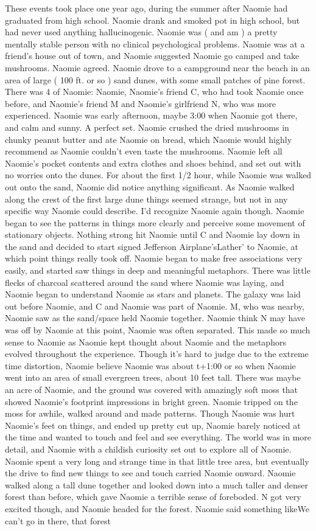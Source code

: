 \documentclass[12pt]{book}
\begin{document}
These events took place one year ago, during the summer after Naomie had graduated from high school. Naomie drank and smoked pot in high school, but had never used anything hallucinogenic. Naomie was ( and am ) a pretty mentally stable person with no clinical psychological problems. Naomie was at a friend's house out of town, and Naomie suggested Naomie go camped and take mushrooms. Naomie agreed. Naomie drove to a campground near the beach in an area of large ( 100 ft. or so ) sand dunes, with some small patches of pine forest. There was 4 of Naomie: Naomie, Naomie's friend C, who had took Naomie once before, and Naomie's friend M and Naomie's girlfriend N, who was more experienced. Naomie was early afternoon, maybe 3:00 when Naomie got there, and calm and sunny. A perfect set. Naomie crushed the dried mushrooms in chunky peanut butter and ate Naomie on bread, which Naomie would highly recommend as Naomie couldn't even taste the mushrooms. Naomie left all Naomie's pocket contents and extra clothes and shoes behind, and set out with no worries onto the dunes. For about the first 1/2 hour, while Naomie was walked out onto the sand, Naomie did notice anything significant. As Naomie walked along the crest of the first large dune things seemed strange, but not in any specific way Naomie could describe. I'd recognize Naomie again though. Naomie began to see the patterns in things more clearly and perceive some movement of stationary objects. Nothing strong hit Naomie until C and Naomie lay down in the sand and decided to start signed Jefferson Airplane'sLather' to Naomie, at which point things really took off. Naomie began to make free associations very easily, and started saw things in deep and meaningful metaphors. There was little flecks of charcoal scattered around the sand where Naomie was laying, and Naomie began to understand Naomie as stars and planets. The galaxy was laid out before Naomie, and C and Naomie was part of Naomie. M, who was nearby, Naomie saw as the sand/space held Naomie together. Naomie think N may have was off by Naomie at this point, Naomie was often separated. This made so much sense to Naomie as Naomie kept thought about Naomie and the metaphors evolved throughout the experience. Though it's hard to judge due to the extreme time distortion, Naomie believe Naomie was about t+1:00 or so when Naomie went into an area of small evergreen trees, about 10 feet tall. There was maybe an acre of Naomie, and the ground was covered with amazingly soft moss that showed Naomie's footprint impressions in bright green. Naomie tripped on the moss for awhile, walked around and made patterns. Though Naomie was hurt Naomie's feet on things, and ended up pretty cut up, Naomie barely noticed at the time and wanted to touch and feel and see everything. The world was in more detail, and Naomie with a childish curiosity set out to explore all of Naomie. Naomie spent a very long and strange time in that little tree area, but eventually the drive to find new things to see and touch carried Naomie onward. Naomie walked along a tall dune together and looked down into a much taller and denser forest than before, which gave Naomie a terrible sense of foreboded. N got very excited though, and Naomie headed for the forest. Naomie said something likeWe can't go in there, that forest 
\end{document}
